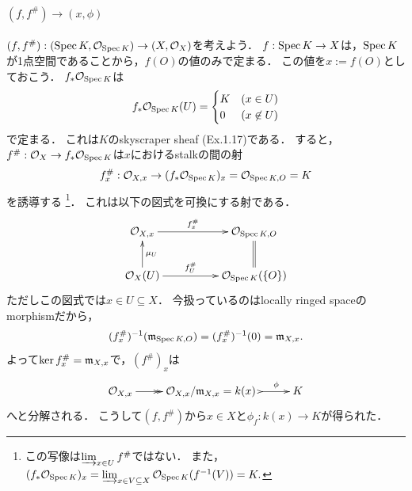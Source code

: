 \documentclass[a4paper]{jsarticle}
\newcommand{\shO}{\mathcal{O}}
\begin{document}
    \paragraph{$(f,f^{\#}) \to (x, \phi)$}
    $(f, f^{\#}): (\Spec K, \shO_{\Spec K}) \to (X, \shO_X)$を考えよう．
    $f: \operatorname{Spec} K \to X$は，$\operatorname{Spec} K$が1点空間であることから，$f(O)$の値のみで定まる．
    この値を$x:=f(O)$としておこう．
    $f_* \shO_{\Spec K}$は
    \[
        f_* \shO_{\Spec K}(U)=
        \begin{cases}{}
            K & (x \in U) \\
            0 & (x \not \in U)
        \end{cases}
    \]
    で定まる．
    これは$K$のskyscraper sheaf (Ex.1.17)である．
    すると，$f^{\#}: \shO_X \to f_* \shO_{\Spec K}$は$x$におけるstalkの間の射
    \[ f^{\#}_{x}: \shO_{X,x} \to (f_* \shO_{\Spec K})_x=\shO_{\Spec K,O}=K \]
    を誘導する
    \footnote
        {
            この写像は$\varinjlim_{x \in U}f^{\#}$ではない．
            また，$(f_* \shO_{\Spec K})_x=\varinjlim_{x \in V \subseteq X} \shO_{\Spec K}(f^{-1}(V))=K.$
        }．
    これは以下の図式を可換にする射である．
    \[
    \xymatrix@C=5em
    {
    \shO_{X,x} \ar[r]^-{f^{\#}_{x}} & \shO_{\Spec K,O} \\
    \shO_X(U) \ar[r]^-{f^{\#}_U} \ar[u]_-{\mu_U} & \shO_{\Spec K}(\{O\}) \ar@{=}[u]
    }
    \]
    ただしこの図式では$x \in U \subseteq X$．
    今扱っているのはlocally ringed spaceのmorphismだから，
    \[ (f^{\#}_{x})^{-1}(\mathfrak{m}_{\operatorname{Spec} K,O})=(f^{\#}_{x})^{-1}(0)=\mathfrak{m}_{X,x}. \]
    よって$\ker f^{\#}_{x}=\mathfrak{m}_{X,x}$で，$(f^{\#})_{x}$は
    \[ \xymatrix{ \shO_{X,x} \ar@{->>}[r]& \shO_{X,x}/\I{m}_{X,x}=k(x)~ \ar@{>->}[r]^-{\phi} & K } \]
    へと分解される．
    こうして$(f,f^{\#})$から$x \in X$と$\phi_f: k(x) \to K$が得られた．
\end{document}
